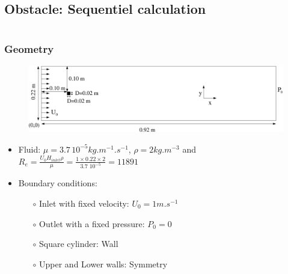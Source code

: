 \documentclass[10pt]{beamer}
\begin{document}
\subsection{Obstacle: Sequentiel calculation}
\begin{frame}
\begin{columns}[c] 
\tableofcontents[sections={1-6},currentsection, currentsubsection]
\tableofcontents[sections={7-12},currentsection, currentsubsection]
\end{columns}
\end{frame}
\begin{frame}
\frametitle{Geometry}
\begin{block}{}

\begin{figure}
\includegraphics[width=1\textwidth]{PICTURES/Obstacle.pdf}
\end{figure}

\begin{itemize}
\item Fluid: $\mu=3.7 \, 10^{-5} kg.m^{-1}.s^{-1}$, $\rho=2 kg.m^{-3}$ and $R_e=\frac{U_0 H_{inlet} \rho}{\mu} = \frac{1 \times 0.22 \times 2}{3.7 \;10^{-5}} = 11 891$
\item Boundary conditions:\\
    \begin{itemize}
    \item [$\circ$] Inlet with fixed velocity: $U_0=1 m.s^{-1}$
    \item [$\circ$] Outlet with a fixed pressure: $P_0=0$
    \item [$\circ$] Square cylinder: Wall
    \item [$\circ$] Upper and Lower walls: Symmetry
    \end{itemize}
\end{itemize}

\end{block}
\end{frame}
\end{document}
